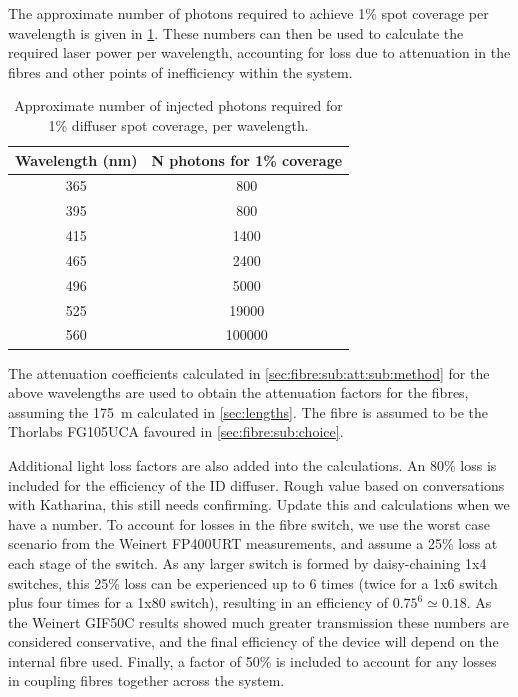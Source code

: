 \documentclass[a4paper,11pt]{article}
\begin{document}
The approximate number of photons required to achieve 1\% spot coverage per wavelength is given in \cref{tab:coverage}. These numbers can then be used to calculate the required laser power per wavelength, accounting for loss due to attenuation in the fibres and other points of inefficiency within the system.
\begin{table}[h]
\centering
\begin{tabular}{cc}
\hline
Wavelength (nm) & N photons for 1\% coverage \\ \hline
365 & 800 \\
395 & 800 \\
415 & 1400 \\
465 & 2400 \\
496 & 5000 \\
525 & 19000\\
560 & 100000 \\ \hline
\end{tabular}
\caption{Approximate number of injected photons required for 1\% diffuser spot coverage, per wavelength.}\label{tab:coverage}
\end{table}
The attenuation coefficients calculated in \cref{sec:fibre:sub:att:sub:method} for the above wavelengths are used to obtain the attenuation factors for the fibres, assuming the 175~m calculated in \cref{sec:lengths}. The fibre is assumed to be the Thorlabs FG105UCA favoured in \cref{sec:fibre:sub:choice}.

Additional light loss factors are also added into the calculations. An 80\% loss is included for the efficiency of the ID diffuser. {\color{red} Rough value based on conversations with Katharina, this still needs confirming. Update this and calculations when we have a number.} To account for losses in the fibre switch, we use the worst case scenario from the Weinert FP400URT measurements, and assume a 25\% loss at each stage of the switch. As any larger switch is formed by daisy-chaining 1x4 switches, this 25\% loss can be experienced up to 6 times (twice for a 1x6 switch plus four times for a 1x80 switch), resulting in an efficiency of $0.75^6 \simeq 0.18$. As the Weinert GIF50C results showed much greater transmission these numbers are considered conservative, and the final efficiency of the device will depend on the internal fibre used. Finally, a factor of 50\% is included to account for any losses in coupling fibres together across the system.
\end{document}

